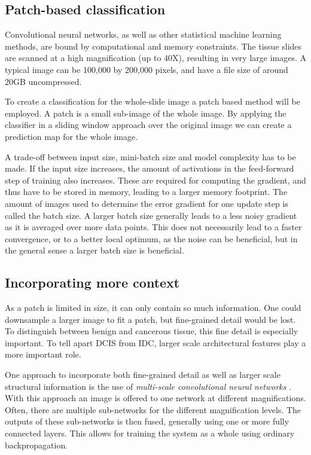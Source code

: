 \documentclass[journal]{IEEEtran}
\begin{document}
\subsection{Patch-based classification}

Convolutional neural networks, as well as other statistical machine learning methods, are bound by computational and memory constraints. The tissue slides are scanned at a high magnification (up to 40X), resulting in very large images. A typical image can be 100,000 by 200,000 pixels, and have a file size of around 20GB uncompressed. 

To create a classification for the whole-slide image a patch based method will be employed. A patch is a small sub-image of the whole image. By applying the classifier in a sliding window approach over the original image we can create a prediction map for the whole image.

A trade-off between input size, mini-batch size and model complexity has to be made. If the input size increases, the amount of activations in the feed-forward step of training also increases. These are required for computing the gradient, and thus have to be stored in memory, leading to a larger memory footprint. The amount of images used to determine the error gradient for one update step is called the batch size. A larger batch size generally leads to a less noisy gradient as it is averaged over more data points. This does not necessarily lead to a faster convergence, or to a better local optimum, as the noise can be beneficial, but in the general sense a larger batch size is beneficial. 

\subsection{Incorporating more context}

As a patch is limited in size, it can only contain so much information. One could downsample a larger image to fit a patch, but fine-grained detail would be lost. To distinguish between benign and cancerous tissue, this fine detail is especially important. To tell apart DCIS from IDC, larger scale architectural features play a more important role. 

One approach to incorporate both fine-grained detail as well as larger scale structural information is the use of \emph{multi-scale convolutional neural networks} \cite{multiscale_shen,buyssens2012multiscale}. With this approach an image is offered to one network at different magnifications. Often, there are multiple sub-networks for the different magnification levels. The outputs of these sub-networks is then fused, generally using one or more fully connected layers. This allows for training the system as a whole using ordinary backpropagation.
\end{document}
